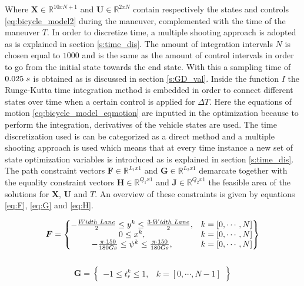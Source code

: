 Where $\bm{X} \in \mathbb{R}^{10xN+1}$ and $\bm{U}\in \mathbb{R}^{2xN}$ contain respectively the states and controls  \ref{eq:bicycle_model2} during the maneuver, complemented with the time of the maneuver $T$. In order to discretize time, a multiple shooting approach is adopted as is explained in section \ref{s:time_dis}. The amount of integration intervals $N$ is chosen equal to $1000$ and is the same as the amount of control intervals in order to go from the initial state towards the end state. With this a sampling time of $0.025 \hspace{1mm}s$ is obtained as is discussed in section \ref{s:GD_val}.  Inside the function $I$ the Runge-Kutta time integration method is embedded in order to connect different states over time when a certain control is applied for $\Delta T$. Here the equations of motion \ref{eq:bicycle_model_eqmotion} are inputted in the optimization because to perform the integration, derivatives of the vehicle states are used. The time discretization used is can be categorized as a direct method and a multiple shooting approach is used which means that at every time instance a new set of state optimization variables is introduced as is explained in section \ref{s:time_dis}. The path constraint vectors $\bm{F} \in \mathbb{R}^{L_1x1}$ and $\bm{G} \in \mathbb{R}^{L_2x1}$ demarcate together with the equality constraint vectors $\bm{H} \in \mathbb{R}^{Q_1x1}$ and $\bm{J} \in \mathbb{R}^{Q_2x1}$ the feasible area of the solutions for $\bm{X}$, $\bm{U}$ and $T$. An overview of these constraints is given by equations \ref{eq:F}, \ref{eq:G} and \ref{eq:H}.

\begin{equation}\label{eq:F}
\bm{F} =
\begin{Bmatrix}
-\frac{Width\hspace{1mm}Lane}{2} \leq y^k \leq \frac{3\cdot Width\hspace{1mm}Lane}{2}, & k = [0,\cdots, N] \\
0 \leq x^k, & k = [0,\cdots, N] \\
-\frac{\pi\cdot 150}{180 Gs} \leq \psi^k \leq \frac{\pi\cdot 150}{180 Gs}, & k = [0,\cdots, N] 

\end{Bmatrix}
\end{equation}\\

\begin{equation}\label{eq:G}
\bm{G} =
\begin{Bmatrix}
-1 \leq t_r^k \leq 1, & k = [0,\cdots, N-1]
\end{Bmatrix}
\end{equation}\\

